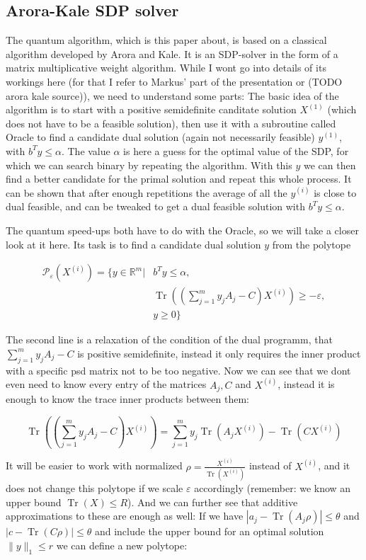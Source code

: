 \documentclass[11pt,a4paper]{scrartcl}
\DeclareMathOperator{\Tr}{Tr}
\newcommand{\R}{\mathbb{R}}
\begin{document}
\subsection{Arora-Kale SDP solver}
The quantum algorithm, which is this paper about, is based on a classical algorithm developed by Arora and Kale. It is an SDP-solver in the form of a matrix multiplicative weight algorithm. While I wont go into details of its workings here (for that I refer to Markus' part of the presentation or (TODO arora kale source)), we need to understand some parts: The basic idea of the algorithm is to start with a positive semidefinite canditate solution $X^{(1)}$ (which does not have to be a feasible solution), then use it with a subroutine called Oracle to find a candidate  dual solution (again not necessarily feasible) $y^{(1)}$, with $b^Ty\leq\alpha$. The value $\alpha$ is here a guess for the optimal value of the SDP, for which we can search binary by repeating the algorithm. With this $y$ we can then find a better candidate for the primal solution and repeat this whole process. It can be shown that after enough repetitions the average of all the $y^{(i)}$ is close to dual feasible, and can be tweaked to get a dual feasible solution with $b^Ty\leq\alpha$.

The quantum speed-ups both have to do with the Oracle, so we will take a closer look at it here. Its task is to find a candidate dual solution $y$ from the polytope

\begin{align*}
\mathcal{P}_\varepsilon (X^{(i)})=\{y\in\R^m | &b^Ty\leq\alpha,\\
 &\Tr\left(\left(\sum_{j=1}^m y_jA_j-C\right)X^{(i)}\right)\geq -\varepsilon,\\
 & y\geq 0\}
\end{align*}

The second line is a relaxation of the condition of the dual programm, that $\sum_{j=1}^m y_jA_j-C$ is positive semidefinite, instead it only requires the inner product with a specific psd matrix not to be too negative. 
Now we can see that we dont even need to know every entry of the matrices $A_j, C$ and $X^{(i)}$, instead it is enough to know the trace inner products between them:

\begin{equation*}
\Tr\left(\left(\sum_{j=1}^m y_jA_j-C\right)X^{(i)}\right)=\sum_{j=1}^m y_j \Tr(A_jX^{(i)})-\Tr(CX^{(i)})
\end{equation*}

It will be easier to work with normalized $\rho=\frac{X^{(i)}}{\Tr(X^{(i)})}$ instead of $X^{(i)}$, and it does not change this polytope if we scale $\varepsilon$ accordingly (remember: we know an upper bound $\Tr(X)\leq R$). And we can further see that additive approximations to these are enough as well: If we have $|a_j-\Tr(A_j\rho)|\leq \theta$ and $|c-\Tr(C\rho)|\leq \theta$ and include the upper bound for an optimal solution $\|y\|_1\leq r$ we can define a new polytope:
\end{document}
